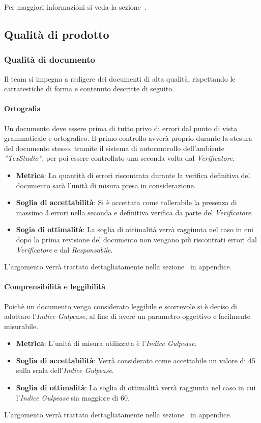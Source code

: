 Per maggiori informazioni si veda la sezione~.

\subsection{Qualità di prodotto}
\subsubsection{Qualità di documento}
Il team si impegna a redigere dei documenti di alta qualità, rispettando le carratestiche di forma e contenuto descritte di seguito.
\paragraph{Ortografia}
Un documento deve essere prima di tutto privo di errori dal punto di vista grammaticale e ortografico. 
Il primo controllo avverà proprio durante la stesura del documento stesso, tramite il sistema di autocontrollo dell'ambiente  \emph{''TexStudio''}, per poi essere controllato una seconda volta dal  \emph{Verificatore}.
\begin{itemize}
	\item \textbf{Metrica}: La quantità di errori riscontrata durante la verifica definitiva del documento sarà l'unità di misura presa in considerazione.
	\item \textbf{Soglia di accettabilità}: Si è accettata come tollerabile la presenza di massimo 3 errori nella seconda e definitiva verifica da parte del \emph{Verificatore}.
	\item \textbf{Sogia di ottimalità}: La soglia di ottimalità verrà raggiunta nel caso in cui dopo la prima revisione del documento non vengano più riscontrati errori dal \emph{Verificatore} e dal \emph{Responsabile}.
\end{itemize}
L'argomento verrà trattato dettagliatamente nella sezione~ in appendice.

\paragraph{Comprensibilità e leggibilità}
Poichè un documento venga considerato leggibile e scorrevole si è deciso di adottare l'\emph{Indice Gulpease}, al fine di avere un parametro oggettivo e facilmente misurabile.
\begin{itemize}
	\item \textbf{Metrica}: L'unità di misura utilizzata è l'\emph{Indice Gulpease}.
	\item \textbf{Soglia di accettabilità}: Verrà considerato come accettabile un valore di 45 sulla scala dell'\emph{Indice Gulpease}.
	\item \textbf{Soglia di ottimalità}: La soglia di ottimalità verrà raggiunta nel caso in cui l'\emph{Indice Gulpease} sia maggiore di 60.
\end{itemize}
L'argomento verrà trattato dettagliatamente nella sezione~ in appendice.

